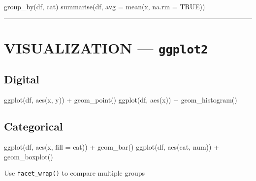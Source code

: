 \documentclass[
  8pt,
  letterpaper,
  DIV=11,
  numbers=noendperiod]{scrartcl}
\newenvironment{Shaded}{\begin{snugshade}}{\end{snugshade}}
\newcommand{\AttributeTok}[1]{\textcolor[rgb]{0.40,0.45,0.13}{#1}}
\newcommand{\ConstantTok}[1]{\textcolor[rgb]{0.56,0.35,0.01}{#1}}
\newcommand{\FunctionTok}[1]{\textcolor[rgb]{0.28,0.35,0.67}{#1}}
\newcommand{\NormalTok}[1]{\textcolor[rgb]{0.00,0.23,0.31}{#1}}
\newcommand{\SpecialCharTok}[1]{\textcolor[rgb]{0.37,0.37,0.37}{#1}}
\begin{document}
\begin{Shaded}
\begin{Highlighting}[]
\FunctionTok{group\_by}\NormalTok{(df, cat)}
\FunctionTok{summarise}\NormalTok{(df, }\AttributeTok{avg =} \FunctionTok{mean}\NormalTok{(x, }\AttributeTok{na.rm =} \ConstantTok{TRUE}\NormalTok{))}
\end{Highlighting}
\end{Shaded}

\begin{center}\rule{0.5\linewidth}{0.5pt}\end{center}

\section{\texorpdfstring{VISUALIZATION ---
\texttt{ggplot2}}{VISUALIZATION --- ggplot2}}\label{visualization-ggplot2}

\subsection{Digital}\label{digital}

\begin{Shaded}
\begin{Highlighting}[]
\FunctionTok{ggplot}\NormalTok{(df, }\FunctionTok{aes}\NormalTok{(x, y)) }\SpecialCharTok{+} \FunctionTok{geom\_point}\NormalTok{()}
\FunctionTok{ggplot}\NormalTok{(df, }\FunctionTok{aes}\NormalTok{(x)) }\SpecialCharTok{+} \FunctionTok{geom\_histogram}\NormalTok{()}
\end{Highlighting}
\end{Shaded}

\subsection{Categorical}\label{categorical}

\begin{Shaded}
\begin{Highlighting}[]
\FunctionTok{ggplot}\NormalTok{(df, }\FunctionTok{aes}\NormalTok{(x, }\AttributeTok{fill =}\NormalTok{ cat)) }\SpecialCharTok{+} \FunctionTok{geom\_bar}\NormalTok{()}
\FunctionTok{ggplot}\NormalTok{(df, }\FunctionTok{aes}\NormalTok{(cat, num)) }\SpecialCharTok{+} \FunctionTok{geom\_boxplot}\NormalTok{()}
\end{Highlighting}
\end{Shaded}

Use \texttt{facet\_wrap()} to compare multiple groups
\end{document}
